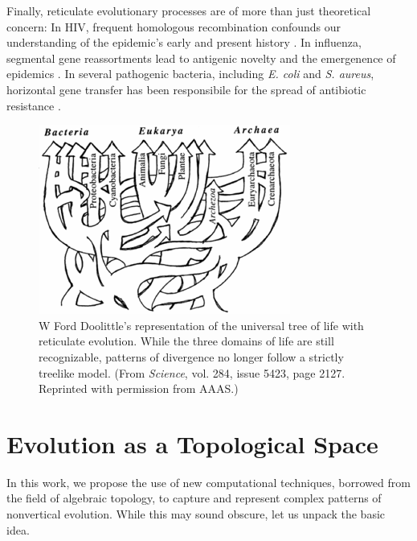 Finally, reticulate evolutionary processes are of more than just theoretical concern:
In HIV, frequent homologous recombination confounds our understanding of the epidemic's early and present history \cite{Burke:1997ep}.
In influenza, segmental gene reassortments lead to antigenic novelty and the emergenence of epidemics \cite{Nelson:2007bc}.
In several pathogenic bacteria, including \emph{E. coli} and \emph{S. aureus}, horizontal gene transfer has been responsibile for the spread of antibiotic resistance \cite{Ochman:2000dr,Alekshun:2007bq}.

\begin{figure}
\centering
\includegraphics[width=.8\columnwidth]{./fig/introduction/doolittle_tree.png}
\caption[Ford Doolittle's Reticulate Tree of Life]{W Ford Doolittle's representation of the universal tree of life with reticulate evolution. While the three domains of life are still recognizable, patterns of divergence no longer follow a strictly treelike model. (From \emph{Science}, vol. 284, issue 5423, page 2127. Reprinted with permission from AAAS.)}
\label{fig:doolittle_tree}
\end{figure}

\section{Evolution as a Topological Space}

In this work, we propose the use of new computational techniques, borrowed from the field of algebraic topology, to capture and represent complex patterns of nonvertical evolution.
While this may sound obscure, let us unpack the basic idea.

